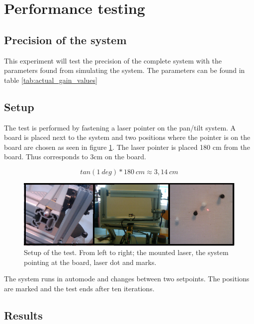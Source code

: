 \section{Performance testing}

\subsection{Precision of the system}\label{subsec:precisionofsystem}
This experiment will test the precision of the complete system with the
parameters found from simulating the system. The parameters can be found in
table \ref{tab:actual_gain_values}

\subsection*{Setup}

The test is performed by fastening a laser pointer on the pan/tilt system. A
board is placed next to the system and two positions where the pointer is on the
board are chosen as seen in figure \ref{fig:systemtestsetup}. The laser pointer is placed 180 cm
from the board. Thus corresponds to 3cm on the board.

\[ tan(1 \ deg) * 180 \ cm \approx 3,14 \ cm \]


\begin{figure}[htb] \centering \includegraphics[width=\textwidth,trim=0 0 0
0]{graphics/overallsystemtest.png} %
	\caption{Setup of the test. From left to right; the mounted laser, the system pointing at the board, laser dot and marks.}
	\label{fig:systemtestsetup}			%
\end{figure}

The system runs in automode and changes between two setpoints. The positions
are marked and the test ends after ten iterations. 

\subsection*{Results}

